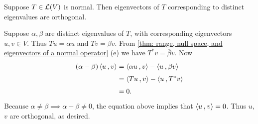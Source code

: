 \begin{thm}
  Suppose $T\in \mathcal{L}(V)$ is normal. Then eigenvectors of $T$ corresponding to distinct eigenvalues are orthogonal.
\end{thm}
\begin{prf}
  Suppose $\alpha, \beta$ are distinct eigenvalues of $T$, with corresponding eigenvectors $u,v \in V$. Thus $Tu=\alpha u$ and $Tv = \beta v$. From \ref{thm: range, null space, and eigenvectors of a normal operator} (e) we have $T^*v = \overline \beta v$. Now
  \[
    \begin{aligned}
      (\alpha -\beta) \ip{u}{v}
      & = \ip{\alpha u}{v}- \ip{u}{\beta v} \\
      & = \ip{Tu}{v}-\ip{u}{T^*v} \\
      & = 0.
    \end{aligned}
  \]
  Because $\alpha \neq \beta \implies \alpha - \beta \neq 0$, the equation above implies that $\ip{u}{v} = 0$. Thus $u$, $v$ are orthogonal, as desired.
\end{prf}

